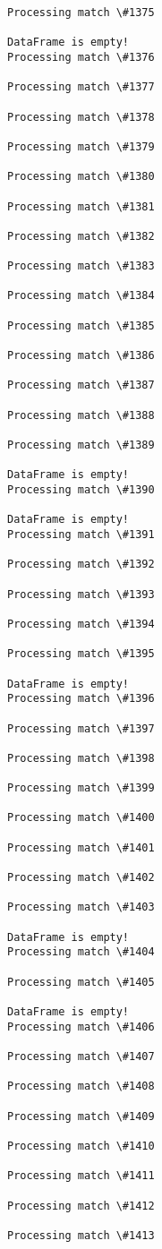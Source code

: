 \documentclass[11pt]{article}
\begin{document}
\begin{Verbatim}[commandchars=\\\{\}]
Processing match \#1375

DataFrame is empty!
Processing match \#1376

Processing match \#1377

Processing match \#1378

Processing match \#1379

Processing match \#1380

Processing match \#1381

Processing match \#1382

Processing match \#1383

Processing match \#1384

Processing match \#1385

Processing match \#1386

Processing match \#1387

Processing match \#1388

Processing match \#1389

DataFrame is empty!
Processing match \#1390

DataFrame is empty!
Processing match \#1391

Processing match \#1392

Processing match \#1393

Processing match \#1394

Processing match \#1395

DataFrame is empty!
Processing match \#1396

Processing match \#1397

Processing match \#1398

Processing match \#1399

Processing match \#1400

Processing match \#1401

Processing match \#1402

Processing match \#1403

DataFrame is empty!
Processing match \#1404

Processing match \#1405

DataFrame is empty!
Processing match \#1406

Processing match \#1407

Processing match \#1408

Processing match \#1409

Processing match \#1410

Processing match \#1411

Processing match \#1412

Processing match \#1413


\end{Verbatim}
\end{document}
